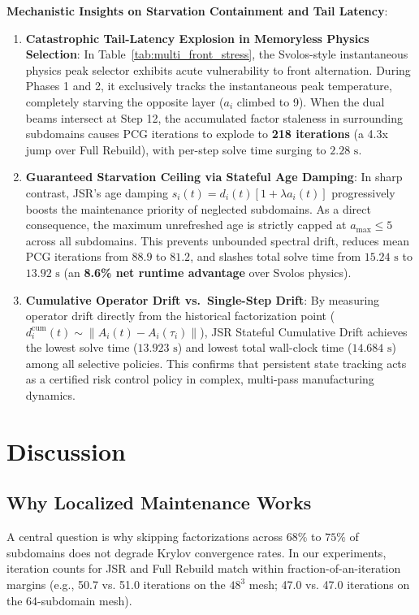 \documentclass[preprint,12pt,3p]{elsarticle}
\begin{document}
\textbf{Mechanistic Insights on Starvation Containment and Tail Latency}:
\begin{enumerate}
    \item \textbf{Catastrophic Tail-Latency Explosion in Memoryless Physics Selection}:
    In Table~\ref{tab:multi_front_stress}, the Svolos-style instantaneous physics peak selector exhibits acute vulnerability to front alternation. During Phases 1 and 2, it exclusively tracks the instantaneous peak temperature, completely starving the opposite layer ($a_i$ climbed to 9). When the dual beams intersect at Step 12, the accumulated factor staleness in surrounding subdomains causes PCG iterations to explode to \textbf{218 iterations} (a 4.3x jump over Full Rebuild), with per-step solve time surging to $2.28\text{ s}$.
    \item \textbf{Guaranteed Starvation Ceiling via Stateful Age Damping}:
    In sharp contrast, JSR's age damping $s_i(t) = d_i(t) [1 + \lambda a_i(t)]$ progressively boosts the maintenance priority of neglected subdomains. As a direct consequence, the maximum unrefreshed age is strictly capped at \textbf{$a_{\text{max}} \le 5$} across all subdomains. This prevents unbounded spectral drift, reduces mean PCG iterations from $88.9$ to $81.2$, and slashes total solve time from $15.24\text{ s}$ to $13.92\text{ s}$ (an \textbf{8.6\% net runtime advantage} over Svolos physics).
    \item \textbf{Cumulative Operator Drift vs.\ Single-Step Drift}:
    By measuring operator drift directly from the historical factorization point ($d_i^{\text{cum}}(t) \sim \|A_i(t) - A_i(\tau_i)\|$), JSR Stateful Cumulative Drift achieves the lowest solve time ($13.923\text{ s}$) and lowest total wall-clock time ($14.684\text{ s}$) among all selective policies. This confirms that persistent state tracking acts as a certified risk control policy in complex, multi-pass manufacturing dynamics.
\end{enumerate}

\section{Discussion}
\label{sec:discussion}

\subsection{Why Localized Maintenance Works}
A central question is why skipping factorizations across $68\%$ to $75\%$ of subdomains does not degrade Krylov convergence rates. In our experiments, iteration counts for JSR and Full Rebuild match within fraction-of-an-iteration margins (e.g., 50.7 vs. 51.0 iterations on the $48^3$ mesh; 47.0 vs. 47.0 iterations on the 64-subdomain mesh).
\end{document}
